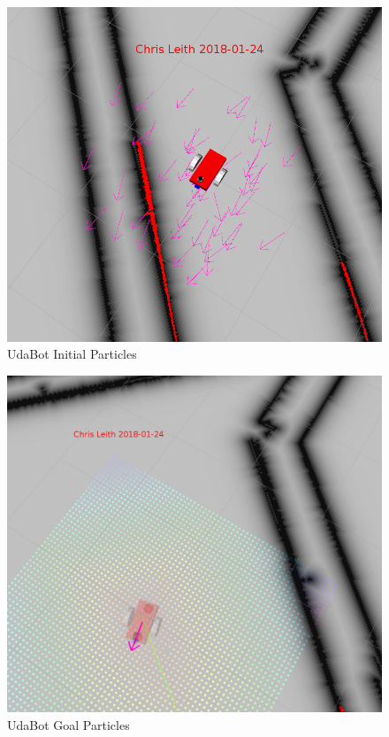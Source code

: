 \documentclass[10pt,journal,compsoc]{IEEEtran}
\begin{document}
\begin{figure}[h]
      \centering
      \includegraphics[width=\linewidth]{../Assets/writeupImages/udaBot_rvizInit.png}
      \caption{UdaBot Initial Particles }
      \label{fig:UdaBot Initial Particles}
\end{figure}

\begin{figure}[h]
      \centering
      \includegraphics[width=\linewidth]{../Assets/writeupImages/udaBot_rvizGoal.png}
      \caption{UdaBot Goal Particles }
      \label{fig:UdaBot Goal Particles}
\end{figure}
\end{document}
